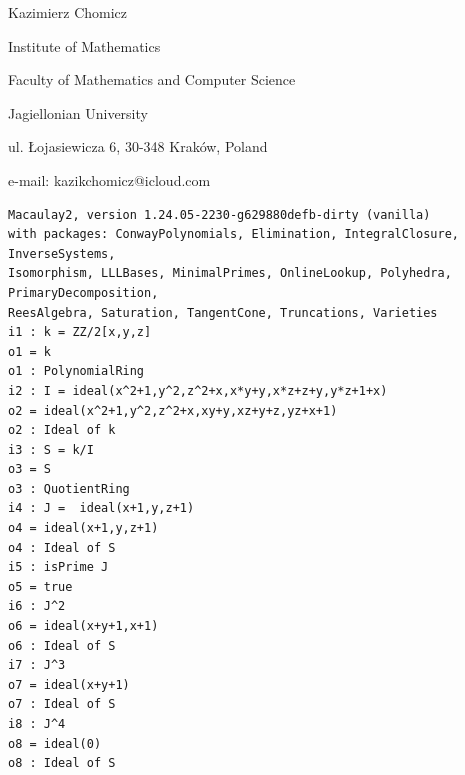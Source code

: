 \documentclass[12pt]{article}
\theoremstyle{remark}
\begin{document}



\vspace{5pt}




\begin{small}





\noindent
Kazimierz Chomicz

\noindent
Institute of Mathematics

\noindent
Faculty of Mathematics and Computer Science

\noindent
Jagiellonian University

\noindent
ul. Łojasiewicza 6, 30-348 Kraków, Poland

\noindent
e-mail: kazikchomicz@icloud.com



\end{small}	








\begin{verbatim}
Macaulay2, version 1.24.05-2230-g629880defb-dirty (vanilla)
with packages: ConwayPolynomials, Elimination, IntegralClosure, InverseSystems, 
Isomorphism, LLLBases, MinimalPrimes, OnlineLookup, Polyhedra, PrimaryDecomposition, 
ReesAlgebra, Saturation, TangentCone, Truncations, Varieties
i1 : k = ZZ/2[x,y,z]
o1 = k 
o1 : PolynomialRing 
i2 : I = ideal(x^2+1,y^2,z^2+x,x*y+y,x*z+z+y,y*z+1+x)
o2 = ideal(x^2+1,y^2,z^2+x,xy+y,xz+y+z,yz+x+1) 
o2 : Ideal of k 
i3 : S = k/I
o3 = S 
o3 : QuotientRing 
i4 : J =  ideal(x+1,y,z+1)
o4 = ideal(x+1,y,z+1) 
o4 : Ideal of S 
i5 : isPrime J
o5 = true 
i6 : J^2
o6 = ideal(x+y+1,x+1) 
o6 : Ideal of S 
i7 : J^3
o7 = ideal(x+y+1) 
o7 : Ideal of S 
i8 : J^4
o8 = ideal(0) 
o8 : Ideal of S
\end{verbatim}

  
\end{document}
